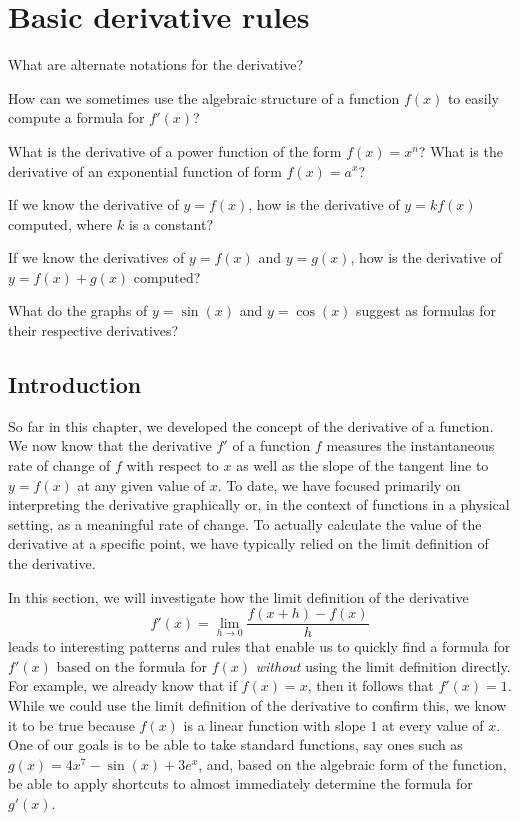 \section{Basic derivative rules} \label{S:2.4.BasicRules}

\begin{goals}
\item What are alternate notations for the derivative?
\item How can we sometimes use the algebraic structure of a function $f(x)$ to easily compute a formula for $f'(x)$?
\item What is the derivative of a power function of the form $f(x) = x^n$?  What is the derivative of an exponential function of form $f(x) = a^x$?
\item If we know the derivative of $y = f(x)$, how is the derivative of $y = k f(x)$ computed, where $k$ is a constant?
\item If we know the derivatives of $y = f(x)$ and $y = g(x)$, how is the derivative of $y = f(x) + g(x)$ computed?
\item What do the graphs of $y = \sin(x)$ and $y = \cos(x)$ suggest as formulas for their respective derivatives?
\end{goals}

\subsection*{Introduction}

So far in this chapter, we developed the concept of the derivative of a function.  We now know that the derivative $f'$ of a function $f$ measures the instantaneous rate of change of $f$ with respect to $x$ as well as the slope of the tangent line to $y=f(x)$ at any given value of $x$.  To date, we have focused primarily on interpreting the derivative graphically or, in the context of functions in a physical setting, as a meaningful rate of change.  To actually calculate the value of the derivative at a specific point, we have typically relied on the limit definition of the derivative.

In this section, we will investigate how the limit definition of the derivative
\[ f'(x) = \lim_{h \to 0} \frac{f(x+h)-f(x)}{h} \]
leads to interesting patterns and rules that enable us to quickly find a formula for $f'(x)$ based on the formula for $f(x)$ \emph{without} using the limit definition directly.  For example, we already know that if $f(x) = x$, then it follows that $f'(x) = 1$.  While we could use the limit definition of the derivative to confirm this, we know it to be true because $f(x)$ is a linear function with slope $1$ at every value of $x$.  One of our goals is to be able to take standard functions, say ones such as $g(x) = 4x^7 - \sin(x) + 3e^x$, and, based on the algebraic form of the function, be able to apply shortcuts to almost immediately determine the formula for $g'(x)$.

